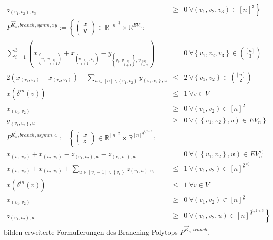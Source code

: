 \documentclass[10p,a4paper,BCOR = 12mm, DIV=15]{scrbook}
\begin{document}
{\begin{Kor}
\begin{eqnarray*}
z_{\left(v_1, v_2\right), v_3} & \geq & 0\nonumber \left. \ \forall \left(v_1, v_2, v_3\right) \in \left[n\right]^{\underline{3}}\right\} \\
P^{\vec{K}_n, branch, symm, xy} := \left\{ \left(\begin{array}{c}
x \\
y
\end{array}\right)\in\mathbb{R}^{[n]^{\underline{2}}}\times \mathbb{R}^{EV_n}: \right.
\nonumber & & \\
\sum_{i=1}^3 \left(x_{\left(v_{i}, v_{i \stackrel{\left[3\right]}{+} 1}\right)} + x_{\left(v_{i \stackrel{\left[3\right]}{+} 1}, v_{i}\right)} -  y_{\left\{v_{i}, v_{i \stackrel{\left[3\right]}{+} 1}\right\}, v_{i \stackrel{\left[3\right]}{+} 2}}\right) & = & 0\ \forall \left\{v_1, v_2, v_3\right\}\in {[n] \choose 3} \\
2 \left(x_{\left(v_1, v_2\right)} + x_{\left(v_2, v_1\right)}\right) + \sum_{u\in[n]\backslash\left\{v_1, v_2\right\}} y_{\left\{v_1, v_2\right\}, u} & \leq & 2\ \forall \left\{v_1, v_2\right\}\in {[n] \choose 2} \\
x\left(\delta^{in}\left(v\right)\right) & \leq & 1 \ \forall v \in V \\
x_{\left(v_1, v_2\right)} & \geq & 0 \ \forall \left(v_1, v_2\right) \in \left[n\right]^{\underline{2}} \nonumber \\
y_{\left\{v_1, v_2\right\}, u} & \geq & 0\nonumber \left. \ \forall \left(\left\{v_1, v_2\right\}, u\right) \in EV_n \right\} \\
P^{\vec{K}_n, branch, asymm, 4} := \left\{
\left(\begin{array}{c}
x \\
z
\end{array}\right)\in \mathbb{R}^{[n]^{\underline{2}}} \times \mathbb{R}^{\left[n\right]^{\underline{3}^{1, 2<3}}}: \nonumber\right. & & \\
x_{\left(v_1, v_2\right)} + x_{\left(v_2, v_1\right)} - z_{\left(v_1, v_2\right), w} - z_{\left(v_2, v_1\right), w} & = & 0\ \forall \left(\left\{v_1, v_2\right\}, w\right)\in EV_n^< \\
x_{\left(v_1, v_2\right)} + x_{\left(v_2, v_1\right)} + \sum_{u\in[v_2-1]\backslash\left\{v_1\right\}} z_{\left(v_1, u\right), v_2} & \leq & 1\ \forall \left(v_1, v_2\right)\in {[n]^{\underline{2}}}^< \\
x\left(\delta^{in}\left(v\right)\right) & \leq & 1 \ \forall v \in V \\
x_{\left(v_1, v_2\right)} & \geq & 0 \ \forall \left(v_1, v_2\right) \in \left[n\right]^{\underline{2}} \nonumber \\
z_{\left(v_1, v_2\right), u} & \geq & 0\nonumber \left. \ \forall \left(v_1, v_2, u\right) \in \left[n\right]^{\underline{3}^{1, 2 < 3}}\right\}
\end{eqnarray*}
bilden erweiterte Formulierungen des Branching-Polytops $P^{\vec{K}_n, branch}$.
\end{Kor}

}
\end{document}
